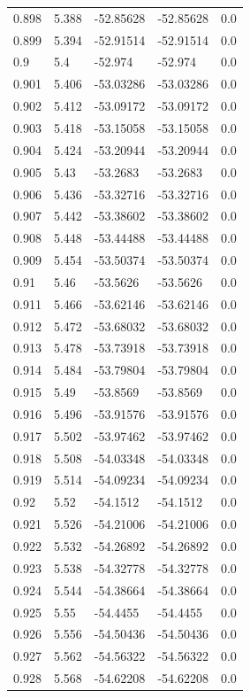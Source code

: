 \begin{tabular}{lllll}
0.898 & 5.388 & -52.85628 & -52.85628 & 0.0 \\
0.899 & 5.394 & -52.91514 & -52.91514 & 0.0 \\
0.9 & 5.4 & -52.974 & -52.974 & 0.0 \\
0.901 & 5.406 & -53.03286 & -53.03286 & 0.0 \\
0.902 & 5.412 & -53.09172 & -53.09172 & 0.0 \\
0.903 & 5.418 & -53.15058 & -53.15058 & 0.0 \\
0.904 & 5.424 & -53.20944 & -53.20944 & 0.0 \\
0.905 & 5.43 & -53.2683 & -53.2683 & 0.0 \\
0.906 & 5.436 & -53.32716 & -53.32716 & 0.0 \\
0.907 & 5.442 & -53.38602 & -53.38602 & 0.0 \\
0.908 & 5.448 & -53.44488 & -53.44488 & 0.0 \\
0.909 & 5.454 & -53.50374 & -53.50374 & 0.0 \\
0.91 & 5.46 & -53.5626 & -53.5626 & 0.0 \\
0.911 & 5.466 & -53.62146 & -53.62146 & 0.0 \\
0.912 & 5.472 & -53.68032 & -53.68032 & 0.0 \\
0.913 & 5.478 & -53.73918 & -53.73918 & 0.0 \\
0.914 & 5.484 & -53.79804 & -53.79804 & 0.0 \\
0.915 & 5.49 & -53.8569 & -53.8569 & 0.0 \\
0.916 & 5.496 & -53.91576 & -53.91576 & 0.0 \\
0.917 & 5.502 & -53.97462 & -53.97462 & 0.0 \\
0.918 & 5.508 & -54.03348 & -54.03348 & 0.0 \\
0.919 & 5.514 & -54.09234 & -54.09234 & 0.0 \\
0.92 & 5.52 & -54.1512 & -54.1512 & 0.0 \\
0.921 & 5.526 & -54.21006 & -54.21006 & 0.0 \\
0.922 & 5.532 & -54.26892 & -54.26892 & 0.0 \\
0.923 & 5.538 & -54.32778 & -54.32778 & 0.0 \\
0.924 & 5.544 & -54.38664 & -54.38664 & 0.0 \\
0.925 & 5.55 & -54.4455 & -54.4455 & 0.0 \\
0.926 & 5.556 & -54.50436 & -54.50436 & 0.0 \\
0.927 & 5.562 & -54.56322 & -54.56322 & 0.0 \\
0.928 & 5.568 & -54.62208 & -54.62208 & 0.0 \\

\end{tabular}
